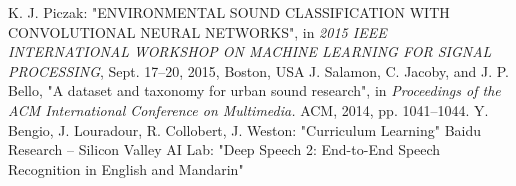 \documentclass[utf-8]{article}
\begin{document}
\begin{thebibliography}{5}
 K. J. Piczak: "ENVIRONMENTAL SOUND CLASSIFICATION
WITH CONVOLUTIONAL NEURAL NETWORKS", in \textit{2015 IEEE INTERNATIONAL WORKSHOP ON MACHINE LEARNING FOR SIGNAL PROCESSING}, Sept. 17–20, 2015, Boston, USA
 J. Salamon, C. Jacoby, and J. P. Bello, "A dataset and
taxonomy for urban sound research", in \textit{Proceedings
of the ACM International Conference on Multimedia.}
ACM, 2014, pp. 1041–1044.
 Y. Bengio, J. Louradour, R. Collobert, J. Weston: "Curriculum Learning"
 Baidu Research – Silicon Valley AI Lab: "Deep Speech 2: End-to-End Speech Recognition in
English and Mandarin"
\end{thebibliography}
\end{document}
